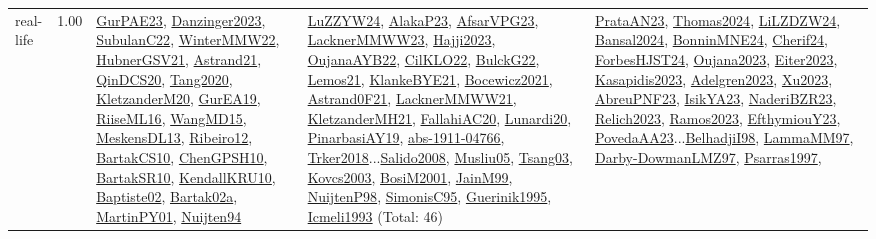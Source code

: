 {\begin{longtable}{p{3cm}r>{\raggedright\arraybackslash}p{6cm}>{\raggedright\arraybackslash}p{6cm}>{\raggedright\arraybackslash}p{8cm}}
\index{real-life}\index{Benchmarks!real-life}real-life &  1.00 & \hyperref[detail:GurPAE23]{GurPAE23}, \hyperref[detail:Danzinger2023]{Danzinger2023}, \hyperref[detail:SubulanC22]{SubulanC22}, \hyperref[detail:WinterMMW22]{WinterMMW22}, \hyperref[detail:HubnerGSV21]{HubnerGSV21}, \hyperref[detail:Astrand21]{Astrand21}, \hyperref[detail:QinDCS20]{QinDCS20}, \hyperref[detail:Tang2020]{Tang2020}, \hyperref[detail:KletzanderM20]{KletzanderM20}, \hyperref[detail:GurEA19]{GurEA19}, \hyperref[detail:RiiseML16]{RiiseML16}, \hyperref[detail:WangMD15]{WangMD15}, \hyperref[detail:MeskensDL13]{MeskensDL13}, \hyperref[detail:Ribeiro12]{Ribeiro12}, \hyperref[detail:BartakCS10]{BartakCS10}, \hyperref[detail:ChenGPSH10]{ChenGPSH10}, \hyperref[detail:BartakSR10]{BartakSR10}, \hyperref[detail:KendallKRU10]{KendallKRU10}, \hyperref[detail:Baptiste02]{Baptiste02}, \hyperref[detail:Bartak02a]{Bartak02a}, \hyperref[detail:MartinPY01]{MartinPY01}, \hyperref[detail:Nuijten94]{Nuijten94} & \hyperref[detail:LuZZYW24]{LuZZYW24}, \hyperref[detail:AlakaP23]{AlakaP23}, \hyperref[detail:AfsarVPG23]{AfsarVPG23}, \hyperref[detail:LacknerMMWW23]{LacknerMMWW23}, \hyperref[detail:Hajji2023]{Hajji2023}, \hyperref[detail:OujanaAYB22]{OujanaAYB22}, \hyperref[detail:CilKLO22]{CilKLO22}, \hyperref[detail:BulckG22]{BulckG22}, \hyperref[detail:Lemos21]{Lemos21}, \hyperref[detail:KlankeBYE21]{KlankeBYE21}, \hyperref[detail:Bocewicz2021]{Bocewicz2021}, \hyperref[detail:Astrand0F21]{Astrand0F21}, \hyperref[detail:LacknerMMWW21]{LacknerMMWW21}, \hyperref[detail:KletzanderMH21]{KletzanderMH21}, \hyperref[detail:FallahiAC20]{FallahiAC20}, \hyperref[detail:Lunardi20]{Lunardi20}, \hyperref[detail:PinarbasiAY19]{PinarbasiAY19}, \hyperref[detail:abs-1911-04766]{abs-1911-04766}, \hyperref[detail:Trker2018]{Trker2018}...\hyperref[detail:Salido2008]{Salido2008}, \hyperref[detail:Musliu05]{Musliu05}, \hyperref[detail:Tsang03]{Tsang03}, \hyperref[detail:Kovcs2003]{Kovcs2003}, \hyperref[detail:BosiM2001]{BosiM2001}, \hyperref[detail:JainM99]{JainM99}, \hyperref[detail:NuijtenP98]{NuijtenP98}, \hyperref[detail:SimonisC95]{SimonisC95}, \hyperref[detail:Guerinik1995]{Guerinik1995}, \hyperref[detail:Icmeli1993]{Icmeli1993} (Total: 46) & \hyperref[detail:PrataAN23]{PrataAN23}, \hyperref[detail:Thomas2024]{Thomas2024}, \hyperref[detail:LiLZDZW24]{LiLZDZW24}, \hyperref[detail:Bansal2024]{Bansal2024}, \hyperref[detail:BonninMNE24]{BonninMNE24}, \hyperref[detail:Cherif24]{Cherif24}, \hyperref[detail:ForbesHJST24]{ForbesHJST24}, \hyperref[detail:Oujana2023]{Oujana2023}, \hyperref[detail:Eiter2023]{Eiter2023}, \hyperref[detail:Kasapidis2023]{Kasapidis2023}, \hyperref[detail:Adelgren2023]{Adelgren2023}, \hyperref[detail:Xu2023]{Xu2023}, \hyperref[detail:AbreuPNF23]{AbreuPNF23}, \hyperref[detail:IsikYA23]{IsikYA23}, \hyperref[detail:NaderiBZR23]{NaderiBZR23}, \hyperref[detail:Relich2023]{Relich2023}, \hyperref[detail:Ramos2023]{Ramos2023}, \hyperref[detail:EfthymiouY23]{EfthymiouY23}, \hyperref[detail:PovedaAA23]{PovedaAA23}...\hyperref[detail:BelhadjiI98]{BelhadjiI98}, \hyperref[detail:LammaMM97]{LammaMM97}, \hyperref[detail:Darby-DowmanLMZ97]{Darby-DowmanLMZ97}, \hyperref[detail:Psarras1997]{Psarras1997}, 
\end{longtable}}
